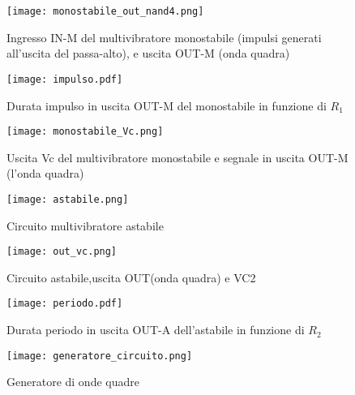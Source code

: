 \begin{figure}[h]
	\centering
	\texttt{[image: monostabile\_out\_nand4.png]}
	\caption{Ingresso IN-M del multivibratore monostabile (impulsi generati all'uscita del passa-alto), e uscita OUT-M (onda quadra) }
	\label{f:monostabile_out_nand4}
\end{figure}

\begin{figure}[h]
	\centering
	\texttt{[image: impulso.pdf]}
	\caption{Durata impulso in uscita OUT-M del monostabile in funzione di $R_{1}$}
	\label{f:impulso}
\end{figure}
	
\begin{figure}[h]
	\centering
	\texttt{[image: monostabile\_Vc.png]}
	\caption{Uscita Vc del multivibratore monostabile e segnale in uscita OUT-M (l'onda quadra)}
	\label{f:monostabile_Vc}
\end{figure}

\begin{figure}[h]
	\centering
	\texttt{[image: astabile.png]}
	\caption{Circuito multivibratore astabile}
	\label{f:astabile}
\end{figure}

\begin{figure}[h]
	\centering
	\texttt{[image: out\_vc.png]}
	\caption{Circuito astabile,uscita OUT(onda quadra) e VC2}
	\label{f:astabile_out_vc}
\end{figure}

\begin{figure}[h]
	\centering
	\texttt{[image: periodo.pdf]}
	\caption{Durata periodo in uscita OUT-A dell'astabile in funzione di $R_{2}$}
	\label{f:periodo}
\end{figure}

\begin{figure}[h]
	\centering
	\texttt{[image: generatore\_circuito.png]}
	\caption{Generatore di onde quadre}
	\label{f:generatore_circuito}
\end{figure}

